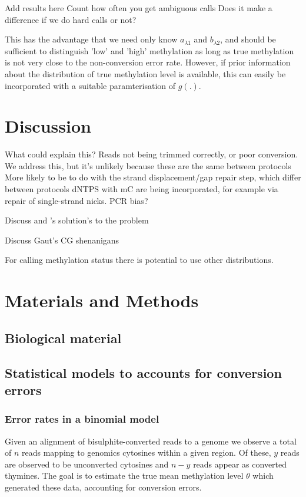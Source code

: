 \documentclass[12pt,longbibliography]{article}
\begin{document}
Add results here
Count how often you get ambiguous calls
Does it make a difference if we do hard calls or not?

This has the advantage that we need only know $a_{\lambda1}$ and $b_{\lambda2}$, and should be sufficient to distinguish 'low' and 'high' methylation as long as true methylation is not very close to the non-conversion error rate.
However, if prior information about the distribution of true methylation level is available, this can easily be incorporated with a suitable paramterisation of $g(.)$.

\section{Discussion}


What could explain this?
Reads not being trimmed correctly, or poor conversion.
We address this, but it's unlikely because these are the same between protocols
More likely to be to do with the strand displacement/gap repair step, which differ between protocols
dNTPS with mC are being incorporated, for example via repair of single-strand nicks.
PCR bias?

Discuss \cite{lu2015improved} and \cite{suzuki2018whole}'s solution's to the problem

Discuss Gaut's CG shenanigans

For calling methylation status there is potential to use other distributions.

\section{Materials and Methods}

\subsection{Biological material}

\subsection{Statistical models to accounts for conversion errors}

\subsubsection{Error rates in a binomial model} \label{sec:binomial-with-errors}

Given an alignment of bisulphite-converted reads to a genome we observe a total of $n$ reads mapping to genomics cytosines within a given region. Of these, $y$ reads are observed to be unconverted cytosines and $n-y$ reads appear as converted thymines. The goal is to estimate the true mean methylation level $\theta$ which generated these data, accounting for conversion errors.
\end{document}
